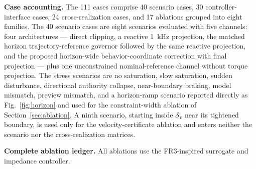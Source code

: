 \documentclass[journal]{IEEEtran}
\begin{document}
\textbf{Case accounting.} The 111 cases comprise 40 scenario cases, 30 controller-interface cases, 24 cross-realization cases, and 17 ablations grouped into eight families. The 40 scenario cases are eight scenarios evaluated with five channels: four architectures --- direct clipping, a reactive 1~kHz projection, the matched horizon trajectory-reference governor followed by the same reactive projection, and the proposed horizon-wide behavior-coordinate correction with final projection --- plus one unconstrained nominal-reference channel without torque projection. The stress scenarios are no saturation, slow saturation, sudden disturbance, directional authority collapse, near-boundary braking, model mismatch, preview mismatch, and a horizon-ramp scenario reported directly as Fig.~\ref{fig:horizon} and used for the constraint-width ablation of Section~\ref{sec:ablation}. A ninth scenario, starting inside $\mathcal S_v$ near its tightened boundary, is used only for the velocity-certificate ablation and enters neither the scenario nor the cross-realization matrices.

\textbf{Complete ablation ledger.} All ablations use the FR3-inspired surrogate and impedance controller.
\end{document}
